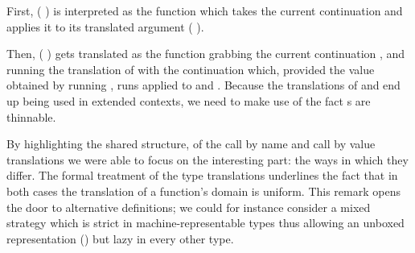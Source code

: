 First, ( ) is interpreted as the function which takes the current
continuation and applies it to its translated argument ( ).


Then, (  ) gets translated as the function grabbing the
current continuation , and running the translation of  with the
continuation which, provided the value  obtained by running ,
runs  applied to  and . Because the translations of 
and  end up being used in extended contexts, we need to make use of the
fact s are thinnable.


By highlighting the shared structure, of the call by name and call by value
translations we were able to focus on the interesting part: the ways in which
they differ. The formal treatment of the type translations underlines the
fact that in both cases the translation of a function's domain is uniform.
This remark opens the door to alternative definitions; we could for instance
consider a mixed strategy which is strict in machine-representable types thus
allowing an unboxed representation (\cite{DBLP:conf/fpca/JonesL91}) but lazy
in every other type.
